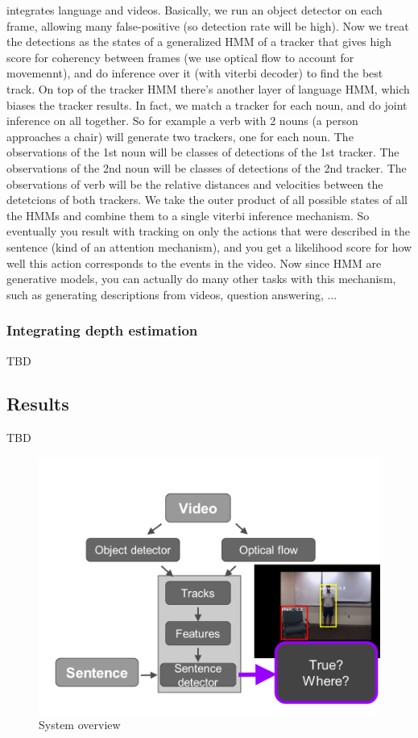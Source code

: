 \documentclass[10pt,twocolumn,letterpaper]{article}
\begin{document}
 integrates language and videos. Basically, we run an object detector on each frame, allowing many false-positive (so detection rate will be high). Now we treat the detections as the states of a generalized HMM of a tracker that gives high score for coherency between frames (we use optical flow to account for movemennt), and do inference over it (with viterbi decoder) to find the best track. 
On top of the tracker HMM there's another layer of language HMM, which biases the tracker results. In fact, we match a tracker for each noun, and do joint inference on all together. So for example a verb with 2 nouns (a person approaches a chair) will generate two trackers, one for each noun. The observations of the 1st noun will be classes of detections of the 1st tracker. The observations of the 2nd noun will be classes of detections of the 2nd tracker. The observations of verb will be the relative distances and velocities between the detetcions of both trackers.
We take the outer product of all possible states of all the HMMs and combine them to a single viterbi inference mechanism. So eventually you result with tracking on only the actions that were described in the sentence (kind of an attention mechanism), and you get a likelihood score for how well this action corresponds to the events in the video. Now since HMM are generative models, you can actually do many other tasks with this mechanism, such as generating descriptions from videos, question answering, ...

\subsubsection{Integrating depth estimation}
TBD

\subsection{Results}
TBD




\begin{figure}[t]
\begin{center}
   \includegraphics[width=0.8\linewidth]{system_overview.png}
\end{center}
   \caption{System overview}
\label{fig_system}
\end{figure}
\end{document}
